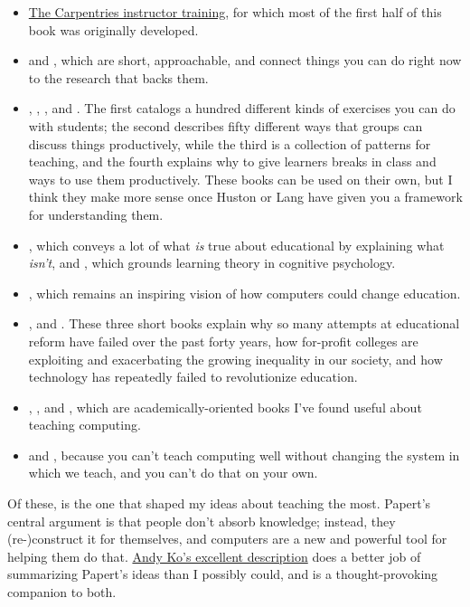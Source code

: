 \begin{itemize}
\item
  \href{http://carpentries.github.io/instructor-training/}{The Carpentries instructor training}, for
  which most of the first half of this book was originally developed.
\item
  \cite{Lang2016} and \cite{Hust2012}, which are short,
  approachable, and connect things you can do right now to the
  research that backs them.
\item
  \cite{Majo2015}, \cite{Broo2016}, \cite{Berg2012}, and
  \cite{Rice2018}. The first catalogs a hundred different kinds of
  exercises you can do with students; the second describes fifty
  different ways that groups can discuss things productively, while
  the third is a collection of patterns for teaching, and the fourth
  explains why to give learners breaks in class and ways to use them
  productively. These books can be used on their own, but I think they
  make more sense once Huston or Lang have given you a framework for
  understanding them.
\item
  \cite{DeBr2015}, which conveys a lot of what \emph{is} true about
  educational by explaining what \emph{isn't}, and \cite{Dida2016},
  which grounds learning theory in cognitive psychology.
\item
  \cite{Pape1993}, which remains an inspiring vision of how
  computers could change education.
\item
  \cite{Gree2014}, \cite{McMi2017} and \cite{Watt2014}. These
  three short books explain why so many attempts at educational reform
  have failed over the past forty years, how for-profit colleges are
  exploiting and exacerbating the growing inequality in our society,
  and how technology has repeatedly failed to revolutionize education.
\item
  \cite{Guzd2015a}, \cite{Hazz2014}, and \cite{Sent2018},
  which are academically-oriented books I've found useful about
  teaching computing.
\item
  \cite{Brow2007} and \cite{Mann2015}, because you can't teach
  computing well without changing the system in which we teach, and
  you can't do that on your own.
\end{itemize}

Of these, \cite{Pape1993} is the one that shaped my ideas about
teaching the most. Papert's central argument is that people don't
absorb knowledge; instead, they (re-)construct it for themselves, and
computers are a new and powerful tool for helping them do that. \href{https://medium.com/bits-and-behavior/mindstorms-what-did-papert-argue-and-what-does-it-mean-for-learning-and-education-c8324b58aca4}{Andy
Ko's excellent description} does a better job of
summarizing Papert's ideas than I possibly could, and
\cite{Craw2010} is a thought-provoking companion to both.

